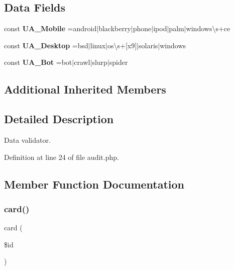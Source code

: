 \subsection*{Data Fields}
{\bf }\par
\begin{DoxyCompactItemize}
\item 
\hypertarget{class_audit_a0a52494b8ebe7bc548e0ff67a81f717c}{}\label{class_audit_a0a52494b8ebe7bc548e0ff67a81f717c} 
const {\bfseries U\+A\+\_\+\+Mobile} =\textquotesingle{}android$\vert$blackberry$\vert$phone$\vert$ipod$\vert$palm$\vert$windows\textbackslash{}s+ce\textquotesingle{}
\item 
\hypertarget{class_audit_af48a17a5642de795ab0da730d87c6109}{}\label{class_audit_af48a17a5642de795ab0da730d87c6109} 
const {\bfseries U\+A\+\_\+\+Desktop} =\textquotesingle{}bsd$\vert$linux$\vert$os\textbackslash{}s+\mbox{[}x9\mbox{]}$\vert$solaris$\vert$windows\textquotesingle{}
\item 
\hypertarget{class_audit_a6c072917477cd06e254dda1a977406e6}{}\label{class_audit_a6c072917477cd06e254dda1a977406e6} 
const {\bfseries U\+A\+\_\+\+Bot} =\textquotesingle{}bot$\vert$crawl$\vert$slurp$\vert$spider\textquotesingle{}
\end{DoxyCompactItemize}

\subsection*{Additional Inherited Members}


\subsection{Detailed Description}
Data validator. 

Definition at line 24 of file audit.\+php.



\subsection{Member Function Documentation}
\hypertarget{class_audit_a631df11fda2fb8e663e24f804c978367}{}\label{class_audit_a631df11fda2fb8e663e24f804c978367} 
\subsubsection{\texorpdfstring{card()}{card()}}
{\footnotesize\ttfamily card (\begin{DoxyParamCaption}\item[{}]{\$id }\end{DoxyParamCaption})}

